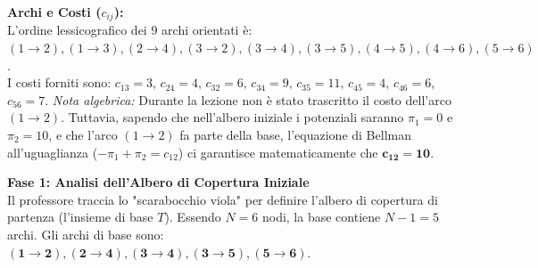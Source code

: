 \documentclass[12pt, a4paper]{article}
\begin{document}
	\textbf{Archi e Costi ($c_{ij}$):}\\
	L'ordine lessicografico dei 9 archi orientati è: $(1\to2), (1\to3), (2\to4), (3\to2), (3\to4), (3\to5), (4\to5), (4\to6), (5\to6)$.\\
	I costi forniti sono: $c_{13}=3$, $c_{24}=4$, $c_{32}=6$, $c_{34}=9$, $c_{35}=11$, $c_{45}=4$, $c_{46}=6$, $c_{56}=7$.
	\textit{Nota algebrica:} Durante la lezione non è stato trascritto il costo dell'arco $(1\to2)$. Tuttavia, sapendo che nell'albero iniziale i potenziali saranno $\pi_1 = 0$ e $\pi_2 = 10$, e che l'arco $(1\to2)$ fa parte della base, l'equazione di Bellman all'uguaglianza ($-\pi_1+\pi_2 = c_{12}$) ci garantisce matematicamente che $\mathbf{c_{12} = 10}$.
	
	\vspace{0.4cm}
	\textbf{Fase 1: Analisi dell'Albero di Copertura Iniziale}\\
	Il professore traccia lo "scarabocchio viola" per definire l'albero di copertura di partenza (l'insieme di base $T$). Essendo $N=6$ nodi, la base contiene $N-1 = 5$ archi. 
	Gli archi di base sono: $\mathbf{(1\to2), (2\to4), (3\to4), (3\to5), (5\to6)}$.
	
\end{document}

